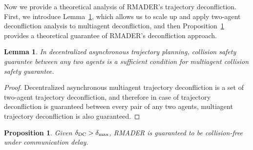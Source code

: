 Now we provide a theoretical analysis of RMADER's trajectory deconfliction. 
First, we introduce Lemma~\ref{lem:two_agent_suffices_multiagent}, which allows us to scale up and apply two-agent deconfliction analysis to multiagent deconfliction, and then Proposition~\ref{prop:rmader_deconfliction_theorem} provides a theoretical guarantee of RMADER's deconfliction approach. 

\newtheorem{lemma}{Lemma}
\begin{lemma}
\label{lem:two_agent_suffices_multiagent}
In decentralized asynchronous trajectory planning, collision safety guarantee between any two agents is a sufficient condition for multiagent collision safety guarantee. 
\end{lemma}

\begin{proof}
Decentralized asynchronous multiagent trajectory deconfliction is a set of two-agent trajectory deconfliction, and therefore in case of trajectory deconfliction is guaranteed between every pair of any two agents, multiagent trajectory deconfliction is also guaranteed. 
\end{proof}

\newtheorem{prop}{Proposition}
\begin{prop}
\label{prop:rmader_deconfliction_theorem}
Given $\delta_\text{DC}{}>\delta_\text{max}{}$, RMADER is guaranteed to be collision-free under communication delay.
\end{prop}

